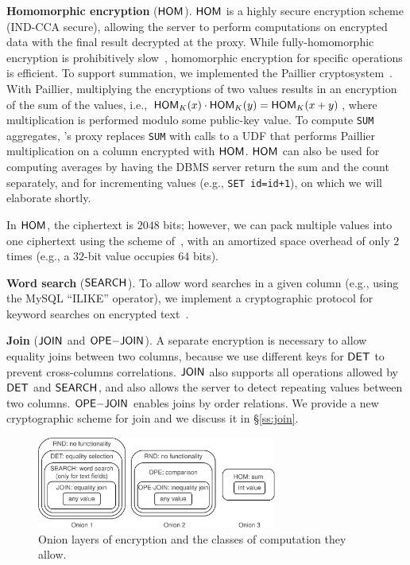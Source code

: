 \textbf{Homomorphic encryption} ($\mathsf{HOM}$)\@. $\mathsf{HOM}$ is a highly secure
encryption scheme (IND-CCA secure), allowing the server to perform
computations on encrypted data with the final result decrypted at the
proxy. While fully-homomorphic encryption is prohibitively
slow~\cite{trillion}, homomorphic encryption for specific operations
is efficient.  To support summation, we implemented the Paillier
cryptosystem~\cite{Paillier99}.  With Paillier, multiplying the
encryptions of two values results in an encryption of the sum of the
values, i.e., $\mathsf{HOM}_K(x) \cdot \mathsf{HOM}_K(y) = \mathsf{HOM}_K(x+y)$, where
multiplication is performed modulo some public-key value.  To compute
{\tt SUM} aggregates, \name's proxy replaces {\tt SUM} with calls to a
UDF that performs Paillier multiplication on a column encrypted with
$\mathsf{HOM}$.  $\mathsf{HOM}$ can also be used for computing averages by having the
DBMS server return the sum and the count separately, and for
incrementing values (e.g., {\tt SET id=id+1}), on which we will
elaborate shortly.

In $\mathsf{HOM}$, the ciphertext is $2048$ bits; however, we can pack
multiple values into one ciphertext using the scheme
of~\cite{GeZ07}, with an amortized space overhead of only $2$ times
(e.g., a $32$-bit value occupies $64$ bits).

\textbf{Word search} ($\mathsf{SEARCH}$)\@.  To allow word searches in a given
column (e.g., using the MySQL ``ILIKE'' operator), we implement a
cryptographic protocol for keyword searches on encrypted
text~\cite{Dawn-Song-Search-2000, amanatidis-boldyreva-o'neill}.

\textbf{Join} ($\mathsf{JOIN}$ and $\mathsf{OPE}\mathrm{-}\mathsf{JOIN}$)\@.  A separate encryption
is necessary to allow equality joins between two columns, because we
use different keys for $\mathsf{DET}$ to prevent cross-columns correlations.   $\mathsf{JOIN}$ also supports all operations allowed by $\mathsf{DET}$ and
$\mathsf{SEARCH}$, and also allows the server to detect repeating values
between two columns.  $\mathsf{OPE}\mathrm{-}\mathsf{JOIN}$ enables joins by order relations. We provide a new cryptographic scheme for join and we discuss it in \S\ref{ss:join}.

\begin{figure}[t!]
\centering
\includegraphics[width=3.1in]{fig/storage.pdf}
\vspace{-0.2in}
\caption{Onion layers of encryption and the classes of computation they allow.}
\label{fig:onion}
\end{figure}

